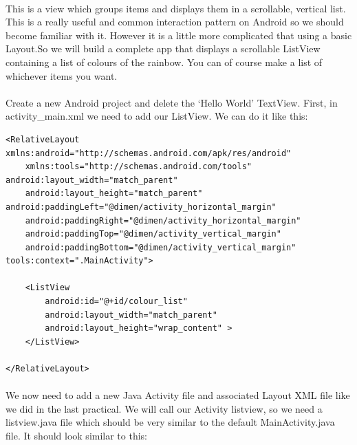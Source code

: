 \documentclass[12pt, a4paper, twoside]{book}
\begin{document}
\paragraph{} This is a view which groups items and displays them in a scrollable, vertical list. This is a really useful and common interaction pattern on Android so we should become familiar with it. However it is a little more complicated that using a basic Layout.So we will build a complete app that displays a scrollable ListView containing a list of colours of the rainbow. You can of course make a list of whichever items you want.

\paragraph{} Create a new Android project and delete the `Hello World' TextView. First, in activity\_main.xml we need to add our ListView. We can do it like this:

\begin{lstlisting}
<RelativeLayout xmlns:android="http://schemas.android.com/apk/res/android"
    xmlns:tools="http://schemas.android.com/tools" android:layout_width="match_parent"
    android:layout_height="match_parent" android:paddingLeft="@dimen/activity_horizontal_margin"
    android:paddingRight="@dimen/activity_horizontal_margin"
    android:paddingTop="@dimen/activity_vertical_margin"
    android:paddingBottom="@dimen/activity_vertical_margin" tools:context=".MainActivity">

    <ListView
        android:id="@+id/colour_list"
        android:layout_width="match_parent"
        android:layout_height="wrap_content" >
    </ListView>

</RelativeLayout>
\end{lstlisting}

\paragraph{} We now need to add a new Java Activity file and associated Layout XML file like we did in the last practical. We will call our Activity listview, so we need a listview.java file which should be very similar to the default MainActivity.java file. It should look similar to this:
\end{document}
